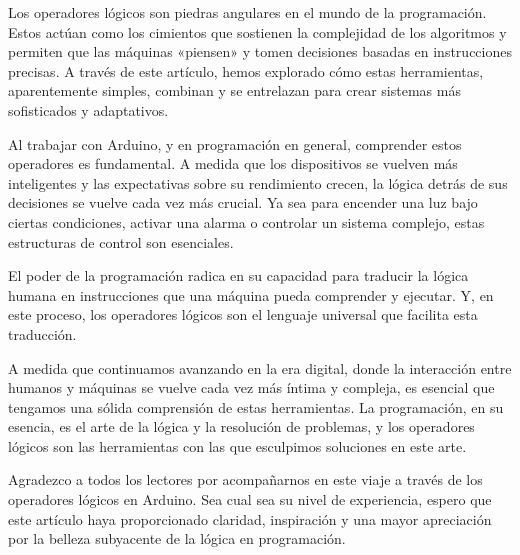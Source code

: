 Los operadores lógicos son piedras angulares en el mundo de la programación. Estos actúan como los cimientos que sostienen la complejidad de los algoritmos y permiten que las máquinas «piensen» y tomen decisiones basadas en instrucciones precisas. A través de este artículo, hemos explorado cómo estas herramientas, aparentemente simples, combinan y se entrelazan para crear sistemas más sofisticados y adaptativos.

Al trabajar con Arduino, y en programación en general, comprender estos operadores es fundamental. A medida que los dispositivos se vuelven más inteligentes y las expectativas sobre su rendimiento crecen, la lógica detrás de sus decisiones se vuelve cada vez más crucial. Ya sea para encender una luz bajo ciertas condiciones, activar una alarma o controlar un sistema complejo, estas estructuras de control son esenciales.

El poder de la programación radica en su capacidad para traducir la lógica humana en instrucciones que una máquina pueda comprender y ejecutar. Y, en este proceso, los operadores lógicos son el lenguaje universal que facilita esta traducción.

A medida que continuamos avanzando en la era digital, donde la interacción entre humanos y máquinas se vuelve cada vez más íntima y compleja, es esencial que tengamos una sólida comprensión de estas herramientas. La programación, en su esencia, es el arte de la lógica y la resolución de problemas, y los operadores lógicos son las herramientas con las que esculpimos soluciones en este arte.

Agradezco a todos los lectores por acompañarnos en este viaje a través de los operadores lógicos en Arduino. Sea cual sea su nivel de experiencia, espero que este artículo haya proporcionado claridad, inspiración y una mayor apreciación por la belleza subyacente de la lógica en programación.